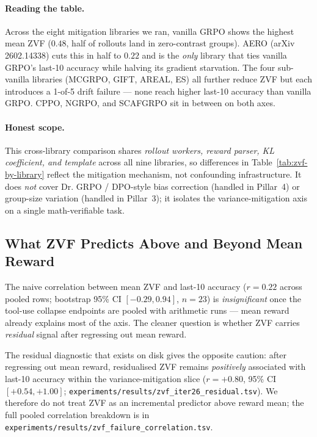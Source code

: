 \paragraph{Reading the table.}
Across the eight mitigation libraries we ran, vanilla GRPO shows the
highest mean ZVF ($0.48$, half of rollouts land in zero-contrast groups).
AERO (arXiv 2602.14338) cuts this in half to $0.22$ and is the
\emph{only} library that ties vanilla GRPO's last-10 accuracy while
halving its gradient starvation. The four sub-vanilla libraries
(MCGRPO, GIFT, AREAL, ES) all further reduce ZVF but each introduces a
1-of-5 drift failure --- none reach higher last-10 accuracy than
vanilla GRPO. CPPO, NGRPO, and SCAFGRPO sit in between on both axes.

\paragraph{Honest scope.}
This cross-library comparison shares \emph{rollout workers, reward
parser, KL coefficient, and template} across all nine libraries, so
differences in Table~\ref{tab:zvf-by-library} reflect the mitigation
mechanism, not confounding infrastructure. It does \emph{not} cover
Dr. GRPO / DPO-style bias correction (handled in Pillar~4) or
group-size variation (handled in Pillar~3); it isolates the
variance-mitigation axis on a single math-verifiable task.

\subsection{What ZVF Predicts Above and Beyond Mean Reward}
\label{sec:zvf-residualised}
The naive correlation between mean ZVF and last-10 accuracy
($r{=}0.22$ across pooled rows; bootstrap 95\% CI $[-0.29,0.94]$,
$n{=}23$) is \emph{insignificant} once the tool-use collapse endpoints
are pooled with arithmetic runs --- mean reward already explains most
of the axis. The cleaner question is whether ZVF carries
\emph{residual} signal after regressing out mean reward.

The residual diagnostic that exists on disk gives the opposite caution:
after regressing out mean reward, residualised ZVF remains \emph{positively}
associated with last-10 accuracy within the variance-mitigation slice
($r=+0.80$, 95\% CI $[+0.54,+1.00]$;
\texttt{experiments/results/zvf\_iter26\_residual.tsv}). We therefore do
not treat ZVF as an incremental predictor above reward mean; the full pooled
correlation breakdown is in \texttt{experiments/results/zvf\_failure\_correlation.tsv}.

